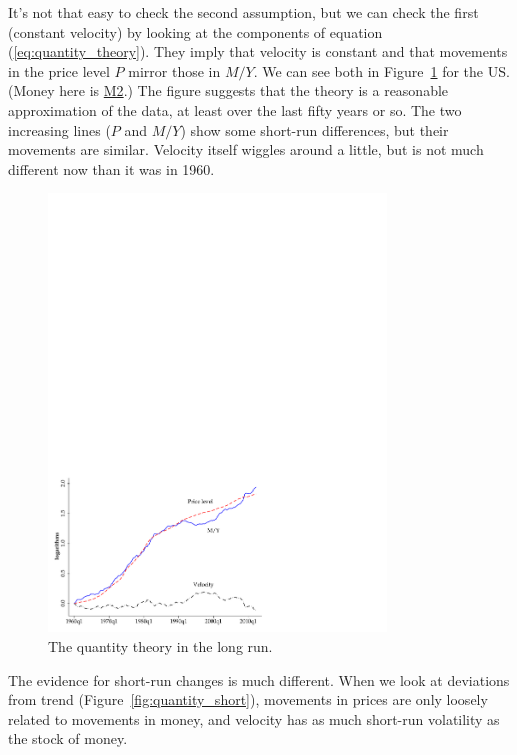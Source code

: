 It's not that easy to check the second assumption, but we can
check the first (constant velocity) by looking at the components of
equation (\ref{eq:quantity_theory}).
They imply that velocity is constant and that movements in the price
level $P$ mirror those in $M/Y$.
We can see both in Figure~\ref{fig:quantity_long} for the US.
(Money here is \href{http://research.stlouisfed.org/fred2/series/M2}{M2}.)
The figure suggests that the theory is a reasonable approximation of the data, at least
over the last fifty years or so.
The two increasing lines ($P$ and $M/Y$)
show some short-run differences, but their movements are similar.
Velocity itself wiggles around a little, but is not
much different now than it was in 1960.
%
\begin{figure}[h]
    \caption{The quantity theory in the long run.}
    \label{fig:quantity_long}
    \centering
    \includegraphics[width=0.8\textwidth]{Figures/long.pdf}
\end{figure}
%

The evidence for short-run changes is much different.
When we look at deviations from trend (Figure~\ref{fig:quantity_short}), movements in prices are only loosely related to movements in money, and
velocity has as much short-run volatility as the stock of money.

